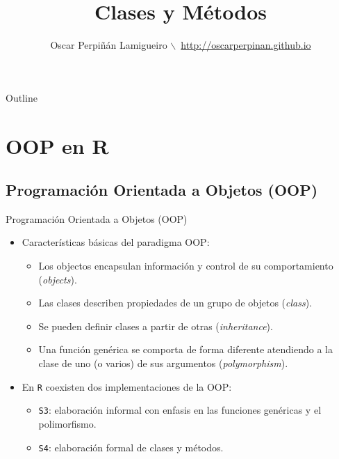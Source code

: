 \documentclass[xcolor={usenames,svgnames,dvipsnames}]{beamer}
\author{Oscar Perpiñán Lamigueiro $\backslash$\ \url{http://oscarperpinan.github.io}}
\date{}
\title{Clases y Métodos}
\begin{document}
\maketitle
\begin{frame}{Outline}
\tableofcontents
\end{frame}


\section{OOP en R}
\label{sec:orgheadline4}
\subsection{Programación Orientada a Objetos (OOP)}
\label{sec:orgheadline3}

\begin{frame}[fragile,label={sec:orgheadline1}]{Programación Orientada a Objetos (OOP)}
 \begin{itemize}
\item Características básicas del paradigma OOP:
\begin{itemize}
\item Los objectos encapsulan información y control de su comportamiento (\emph{objects}).
\item Las clases describen propiedades de un grupo de objetos (\emph{class}).
\item Se pueden definir clases a partir de otras (\emph{inheritance}).
\item Una función genérica se comporta de forma diferente atendiendo a la
clase de uno (o varios) de sus argumentos (\emph{polymorphism}).
\end{itemize}
\item En \texttt{R} coexisten dos implementaciones de la OOP:
\begin{itemize}
\item \texttt{S3}: elaboración informal con enfasis en las funciones genéricas y el polimorfismo.
\item \texttt{S4}: elaboración formal de clases y métodos.
\end{itemize}
\end{itemize}
\end{frame}
\end{document}
